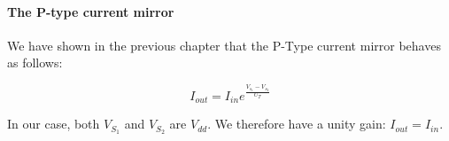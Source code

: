 \newline \newline
\paragraph{The P-type current mirror}

We have shown in the previous chapter that the P-Type current mirror behaves as follows: 

\begin{equation}
I_{out} = I_{in} e^{\frac{V_{s_1} - V_{s_2}}{U_T}}
\end{equation}

In our case, both $V_{S_1}$ and $V_{S_2}$ are $V_{dd}$. We therefore have a unity gain: $I_{out} = I_{in}$. 


